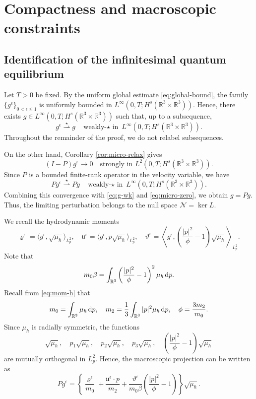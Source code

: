 \documentclass[10pt,reqno]{amsart}
\numberwithin{equation}{section}
\newcommand{\lt}{\left}
\newcommand{\rt}{\right}
\newcommand{\lal}{\langle}
\newcommand{\ral}{\rangle}
\newcommand{\mR}{\mathbb{R}}
\newcommand{\vrh}{\varrho}
\newcommand{\vth}{\vartheta}
\newcommand{\mfu}{\mathfrak{u}}
\newcommand{\intr}{\int_{\mR^3}}
\newcommand{\R}{\mathbb R}
\newcommand{\bq}{\begin{equation}}
\newcommand{\eq}{\end{equation}}
\newcommand{\calN}{\mathcal N}
\newcommand{\rdp}{\textnormal{d}p}
\begin{document}
\section{Compactness and macroscopic constraints}\label{sec:compact}
%
%
%
%
%
%
%
%
%
%

\subsection{Identification of the infinitesimal quantum equilibrium} 

Let $T>0$ be fixed. By the uniform global estimate \eqref{eq:global-bound}, the family $\{g^\epsilon\}_{0<\epsilon\le1}$ is uniformly bounded in $L^\infty(0,T;H^s(\R^3\times\R^3))$. Hence, there exists $g\in L^\infty(0,T;H^s(\R^3\times\R^3))$ such that, up to a subsequence,
\bq\label{eq:g-wk}
g^\epsilon\overset{\star}{\rightharpoonup}g\quad\text{weakly-$\star$ in }L^\infty(0,T;H^s(\R^3\times\R^3)).
\eq
Throughout the remainder of the proof, we do not relabel subsequences.

On the other hand, Corollary \ref{cor:micro-relax} gives
\bq\label{eq:micro-zero}
(I-P)g^\epsilon\to0\quad\text{strongly in }L^2(0,T;H^s(\R^3\times\R^3)).
\eq
Since $P$ is a bounded finite-rank operator in the velocity variable, we have
\[
P g^\epsilon\overset{\star}{\rightharpoonup}P g\quad\text{weakly-$\star$ in }L^\infty(0,T;H^s(\R^3\times\R^3)).
\]
Combining this convergence with \eqref{eq:g-wk} and \eqref{eq:micro-zero}, we obtain $g=P g$. Thus, the limiting perturbation belongs to the null space $\calN=\ker L $.

We recall the hydrodynamic moments
\bq\label{eq:hydro-mom}
\vrh^\epsilon=\lal g^\epsilon,\sqrt{\mu_\hbar}\ral_{L^2_p},\quad \mfu^\epsilon=\lal g^\epsilon,p\sqrt{\mu_\hbar}\ral_{L^2_p},\quad \vth^\epsilon=\lt\lal g^\epsilon,\lt(\frac{|p|^2}{\phi }-1\rt)\sqrt{\mu_\hbar}\rt\ral_{L^2_p}.
\eq
Note that
\[
m_0\beta=\intr \lt(\frac{|p|^2}{\phi }-1\rt)^2\mu_\hbar\,\rdp.
\]
Recall from \eqref{eq:mom-h} that
\[
m_0 =\intr \mu_\hbar\,\rdp,\quad m_2 =\frac{1}{3}\intr |p|^2\mu_\hbar\,\rdp,\quad \phi =\frac{3m_2 }{m_0 }.
\]
Since $\mu_\hbar$ is radially symmetric, the functions
\[
\sqrt{\mu_\hbar},\quad p_1\sqrt{\mu_\hbar},\quad p_2\sqrt{\mu_\hbar},\quad p_3\sqrt{\mu_\hbar},\quad \lt(\frac{|p|^2}{\phi }-1\rt)\sqrt{\mu_\hbar}
\]
are mutually orthogonal in $L^2_p$. Hence, the macroscopic projection can be written as
\bq\label{eq:Pg-hydro}
P g^\epsilon=\lt\{\frac{\vrh^\epsilon}{m_0 }+\frac{\mfu^\epsilon\cdot p}{m_2 }+\frac{\vth^\epsilon}{m_0\beta}\lt(\frac{|p|^2}{\phi }-1\rt)\rt\}\sqrt{\mu_\hbar}.
\eq
\end{document}
